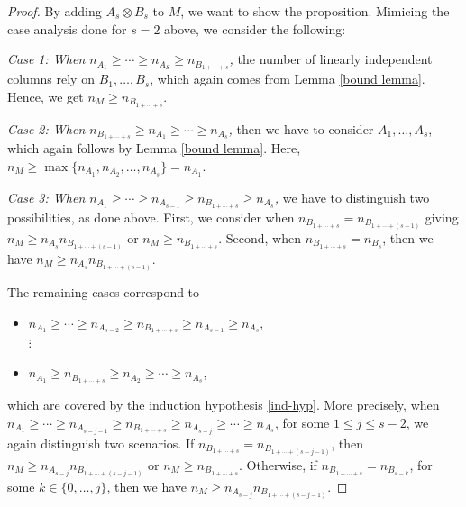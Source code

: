 \documentclass[11pt]{amsart}
\theoremstyle{plain}
\theoremstyle{definition}
\numberwithin{equation}{section}
\begin{document}
\begin{proof}
By adding $A_s\otimes B_s$ to $M$, we want to show the proposition. Mimicing the case analysis done for $s=2$ above, we consider the following:

\emph{Case 1: When $n_{A_1}\geq \cdots\geq n_{A_S}\geq n_{B_{1+\cdots +s}}$,} the number of linearly independent columns rely on $B_1, \ldots, B_s$, which again comes from Lemma \ref{bound lemma}. Hence, we get $n_M\geq n_{B_{1+\cdots + s}}$.

\emph{Case 2: When $n_{B_{1+\cdots +s}}\geq n_{A_1}\geq \cdots\geq n_{A_s}$,} then we have to consider $A_1,\ldots,A_s$, which again follows by Lemma \ref{bound lemma}. Here, $n_M\geq\max\{n_{A_1},n_{A_2},\ldots, n_{A_s}\}=n_{A_1}$.

\emph{Case 3: When $n_{A_1}\geq \cdots \geq n_{A_{s-1}}\geq n_{B_{1+\cdots +s}}\geq n_{A_s}$,} we have to distinguish two possibilities, as done above. First, we consider when $n_{B_{1+\cdots +s}}=n_{B_{1+\cdots +(s-1)}}$ giving $n_M\geq n_{A_s} n_{B_{1+\cdots +(s-1)}}$ or  $n_M\geq n_{B_{1+\cdots +s}}$. Second, when $n_{B_{1+\cdots +s}}=n_{B_s}$, then we have $n_M\geq n_{A_s} n_{B_{1+\cdots +(s-1)}}$.

The remaining cases correspond to
\begin{itemize}
\item $n_{A_1}\geq \cdots \geq n_{A_{s-2}}\geq n_{B_{1+\cdots +s}}\geq n_{A_{s-1}}\geq n_{A_s}$,\\
 $\vdots$
\item $ n_{A_1}\geq n_{B_{1+\cdots +s}}\geq n_{A_2}\geq \cdots \geq n_{A_s}$,
\end{itemize}
which are covered by the induction hypothesis \eqref{ind-hyp}. More precisely, when $n_{A_1}\geq \cdots \geq n_{A_{s-j-1}}\geq n_{B_{1+\cdots +s}}\geq n_{A_{s-j}}\geq \cdots \geq n_{A_s}$, for some $1\leq j \leq s-2$, we again distinguish two scenarios. If $n_{B_{1+\cdots +s}}=n_{B_{1+\cdots +(s-j-1)}}$, then $n_M\geq n_{A_{s-j}} n_{B_{1+\cdots +(s-j-1)}}$ or  $n_M\geq n_{B_{1+\cdots +s}}$. Otherwise, if $n_{B_{1+\cdots +s}}=n_{B_{s-k}}$, for some $k\in\{0,\ldots, j\}$, then we have $n_M\geq n_{A_{s-j}} n_{B_{1+\cdots +(s-j-1)}}$.
\end{proof}
\end{document}
